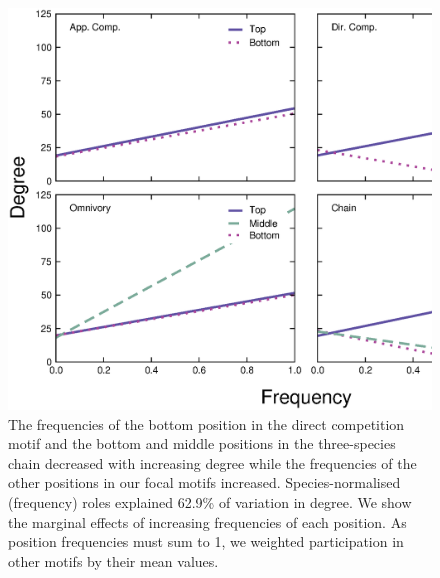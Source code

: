 \documentclass[12pt]{article}
\begin{document}
    \begin{figure}[ht!]
        \centering
        \includegraphics[width=\textwidth]{figures/positions_vs_Deg_freq.eps}
        \caption{The frequencies of the bottom position in the direct competition motif and the bottom and middle positions in the three-species chain decreased with increasing degree while the frequencies of the other positions in our focal motifs increased. Species-normalised (frequency) roles explained 62.9\% of variation in degree. We show the marginal effects of increasing frequencies of each position. As position frequencies must sum to 1, we weighted participation in other motifs by their mean values.}
        \label{fig:positions_deg}
    \end{figure}

\clearpage
\end{document}
